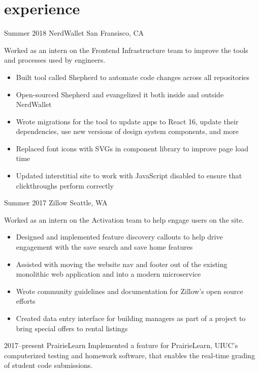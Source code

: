 \documentclass[nofooter]{resume}
\begin{document}

\section{experience}


\begin{entrylist}


\entry
{Summer 2018}
{NerdWallet}
{San Fransisco, CA}
{Worked as an intern on the Frontend Infrastructure team to improve the tools and processes used by engineers.
\noindent\begin{itemize}[leftmargin=0.45cm]
\item Built tool called Shepherd to automate code changes across all repositories
\item Open-sourced Shepherd and evangelized it both inside and outside NerdWallet
\item Wrote migrations for the tool to update apps to React 16, update their dependencies, use new versions of design system components, and more
\item Replaced font icons with SVGs in component library to improve page load time
\item Updated interstitial site to work with JavaScript disabled to ensure that clickthroughs perform correctly
\end{itemize}}

\entry
{Summer 2017}
{Zillow}
{Seattle, WA}
{Worked as an intern on the Activation team to help engage users on the site.
\noindent\begin{itemize}[leftmargin=0.45cm]
\item Designed and implemented feature discovery callouts to help drive engagement with the save search and save home features
\item Assisted with moving the website nav and footer out of the existing monolithic web application and into a modern microservice
\item Wrote community guidelines and documentation for Zillow's open source efforts
\item Created data entry interface for building managers as part of a project to bring special offers to rental listings
\end{itemize}}


\entry
{2017--present}
{PrairieLearn}
{}
{Implemented a feature for PrairieLearn, UIUC's computerized testing and homework software, that enables the real-time grading of student code submissions.}

\end{entrylist}
\end{document}
